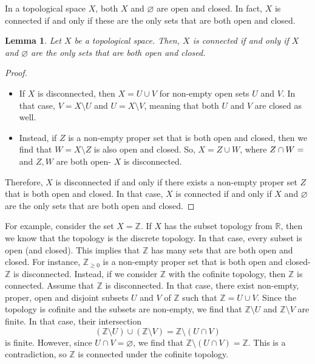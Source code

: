 \documentclass[a4paper, openany]{memoir}
\theoremstyle{definition}
\theoremstyle{plain}
\newtheorem{lemma}[definition]{Lemma}
\begin{document}
In a topological space $X$, both $X$ and $\varnothing$ are open and closed. In fact, $X$ is connected if and only if these are the only sets that are both open and closed.
\begin{lemma}
Let $X$ be a topological space. Then, $X$ is connected if and only if $X$ and $\varnothing$ are the only sets that are both open and closed.
\end{lemma}
\begin{proof}
\hspace*{0pt}
\begin{itemize}
    \item If $X$ is disconnected, then $X = U \cup V$ for non-empty open sets $U$ and $V$. In that case, $V = X \setminus U$ and $U = X \setminus V$, meaning that both $U$ and $V$ are closed as well. 
    
    \item Instead, if $Z$ is a non-empty proper set that is both open and closed, then we find that $W = X \setminus Z$ is also open and closed. So, $X = Z \cup W$, where $Z \cap W = \empty$ and $Z, W$ are both open- $X$ is disconnected.
\end{itemize}
Therefore, $X$ is disconnected if and only if there exists a non-empty proper set $Z$ that is both open and closed. In that case, $X$ is connected if and only if $X$ and $\varnothing$ are the only sets that are both open and closed.
\end{proof}
\noindent For example, consider the set $X = \mathbb{Z}$. If $X$ has the subset topology from $\mathbb{R}$, then we know that the topology is the discrete topology. In that case, every subset is open (and closed). This implies that $\mathbb{Z}$ has many sets that are both open and closed. For instance, $\mathbb{Z}_{\geqslant 0}$ is a non-empty proper set that is both open and closed- $\mathbb{Z}$ is disconnected. Instead, if we consider $\mathbb{Z}$ with the cofinite topology, then $\mathbb{Z}$ is connected. Assume that $\mathbb{Z}$ is disconnected. In that case, there exist non-empty, proper, open and disjoint subsets $U$ and $V$ of $\mathbb{Z}$ such that $\mathbb{Z} = U \cup V$. Since the topology is cofinite and the subsets are non-empty, we find that $\mathbb{Z} \setminus U$ and $\mathbb{Z} \setminus V$ are finite. In that case, their intersection
\[(\mathbb{Z} \setminus U) \cup (\mathbb{Z} \setminus V) = \mathbb{Z} \setminus (U \cap V)\]
is finite. However, since $U \cap V = \varnothing$, we find that $\mathbb{Z} \setminus (U \cap V) = \mathbb{Z}$. This is a contradiction, so $\mathbb{Z}$ is connected under the cofinite topology.
\end{document}
